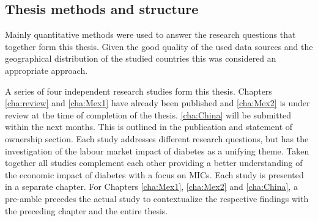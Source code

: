 \subsection{Thesis methods and structure}

Mainly quantitative methods were used to answer the research questions that together form this thesis. Given the good quality of the used data sources and the geographical distribution of the studied countries this was considered an appropriate approach. 

A series of four independent research studies form this thesis. Chapters \ref{cha:review} and \ref{cha:Mex1} have already been published and \ref{cha:Mex2} is under review at the time of completion of the thesis. \ref{cha:China} will be submitted within the next months. This is outlined in the publication and statement of ownership section. Each study addresses different research questions, but has the investigation of the labour market impact of diabetes as a unifying theme. Taken together all studies complement each other providing a better understanding of the economic impact of diabetes with a focus on \acp{MIC}. Each study is presented in a separate chapter. For Chapters \ref{cha:Mex1}, \ref{cha:Mex2} and \ref{cha:China}, a pre-amble precedes the actual study to contextualize the respective findings with the preceding chapter and the entire thesis.


